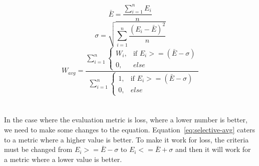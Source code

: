 \documentclass[12pt]{article}
\begin{document}
\begin{equation}\label{eq:selective-avg-mean}
	\bar{E} = \frac{\sum_{i=1}^{n}{E_i}}{n}
\end{equation}
\begin{equation}\label{eq:selective-avg-stddev}
	\sigma = \sqrt{\sum_{i=1}^{n}{\frac{\left( {E_i - \bar{E}} \right)^{2}}{n}}}
\end{equation}
\begin{equation}\label{eq:selective-avg}
	W_{avg} = \frac{\sum_{i=1}^{n} \begin{cases}
		W_i, & \text{if }E_i>=\left(\bar{E}-\sigma\right)\\
		0,   & else
	\end{cases}}
	{\sum_{i=1}^{n} \begin{cases}
		1, & \text{if }E_i>=\left(\bar{E}-\sigma\right)\\
		0,   & else
	\end{cases}}
\end{equation}
\\\\
In the case where the evaluation metric is loss, where a lower number is better, we need to make some changes to the equation. Equation~\ref{eq:selective-avg} caters to a metric where a higher value is better. To make it work for loss, the criteria must be changed from $E_i >= \bar{E}-\sigma$ to $E_i <= \bar{E}+\sigma$ and then it will work for a metric where a lower value is better.
\\\\
\end{document}
